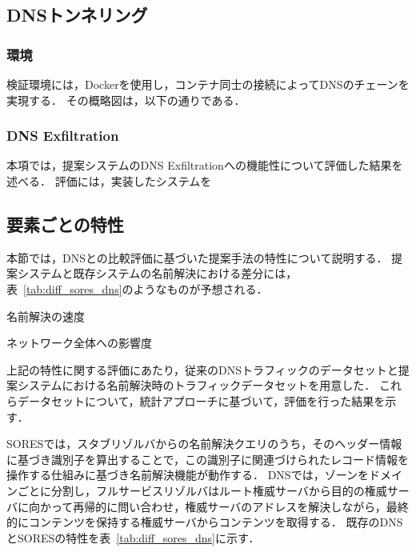 \subsection{DNSトンネリング}
\label{sec:eval-tunnel}
\subsubsection{環境}
検証環境には，Dockerを使用し，コンテナ同士の接続によってDNSのチェーンを実現する．
その概略図は，以下の通りである．

\subsubsection{DNS Exfiltration}
本項では，提案システムのDNS Exfiltrationへの機能性について評価した結果を述べる．
評価には，実装したシステムを


\subsection{要素ごとの特性}
\label{sec:eval-feature}
本節では，DNSとの比較評価に基づいた提案手法の特性について説明する．
提案システムと既存システムの名前解決における差分には，表~\ref{tab:diff_sores_dns}のようなものが予想される．



\begin{description}
 \setlength{\itemsep}{0pt}
 \setlength{\leftskip}{1.0cm}
 \item[RTT:] 名前解決の速度
 \item[トラフィック量:] ネットワーク全体への影響度
\end{description}

上記の特性に関する評価にあたり，従来のDNSトラフィックのデータセットと提案システムにおける名前解決時のトラフィックデータセットを用意した．
これらデータセットについて，統計アプローチに基づいて，評価を行った結果を示す．

SORESでは，スタブリゾルバからの名前解決クエリのうち，そのヘッダー情報に基づき識別子を算出することで，この識別子に関連づけられたレコード情報を操作する仕組みに基づき名前解決機能が動作する．
DNSでは，ゾーンをドメインごとに分割し，フルサービスリゾルバはルート権威サーバから目的の権威サーバに向かって再帰的に問い合わせ，権威サーバのアドレスを解決しながら，最終的にコンテンツを保持する権威サーバからコンテンツを取得する．
既存のDNSとSORESの特性を表~\ref{tab:diff_sores_dns}に示す．


